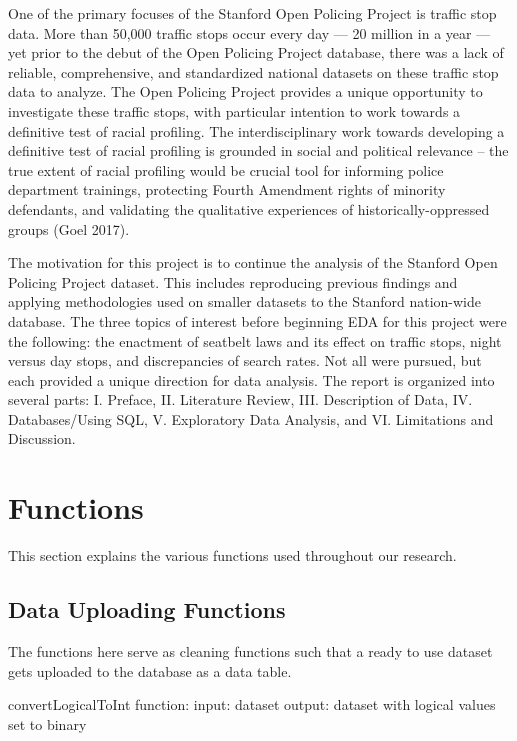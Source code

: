 \documentclass[
]{book}
\begin{document}
\quad One of the primary focuses of the Stanford Open Policing Project is traffic stop data. More than 50,000 traffic stops occur every day --- 20 million in a year --- yet prior to the debut of the Open Policing Project database, there was a lack of reliable, comprehensive, and standardized national datasets on these traffic stop data to analyze. The Open Policing Project provides a unique opportunity to investigate these traffic stops, with particular intention to work towards a definitive test of racial profiling. The interdisciplinary work towards developing a definitive test of racial profiling is grounded in social and political relevance -- the true extent of racial profiling would be crucial tool for informing police department trainings, protecting Fourth Amendment rights of minority defendants, and validating the qualitative experiences of historically-oppressed groups (Goel 2017).

\quad The motivation for this project is to continue the analysis of the Stanford Open Policing Project dataset. This includes reproducing previous findings and applying methodologies used on smaller datasets to the Stanford nation-wide database. The three topics of interest before beginning EDA for this project were the following: the enactment of seatbelt laws and its effect on traffic stops, night versus day stops, and discrepancies of search rates. Not all were pursued, but each provided a unique direction for data analysis. The report is organized into several parts: I. Preface, II. Literature Review, III. Description of Data, IV. Databases/Using SQL, V. Exploratory Data Analysis, and VI. Limitations and Discussion.

\hypertarget{functions}{%
\chapter{Functions}\label{functions}}

This section explains the various functions used throughout our research.

\hypertarget{data-uploading-functions}{%
\section{Data Uploading Functions}\label{data-uploading-functions}}

The functions here serve as cleaning functions such that a ready to use dataset gets uploaded to the database as a data table.

convertLogicalToInt function:
input: dataset
output: dataset with logical values set to binary
\end{document}
